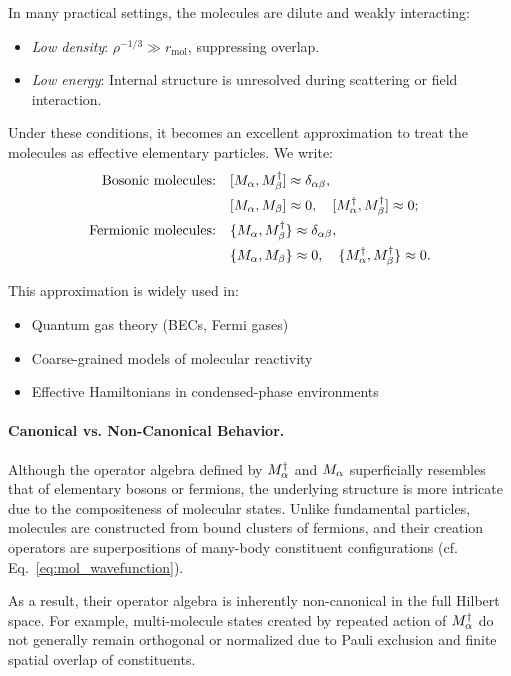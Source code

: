 In many practical settings, the molecules are dilute and weakly interacting:
\begin{itemize}
	\item \emph{Low density}: \(\rho^{-1/3} \gg r_\text{mol}\), suppressing overlap.
	\item \emph{Low energy}: Internal structure is unresolved during scattering or field interaction.
\end{itemize}

Under these conditions, it becomes an excellent approximation to treat the molecules as effective elementary particles. We write:
\begin{align}
	\text{Bosonic molecules:} \quad
	&[M_{\alpha}, M^\dagger_{\beta}] \approx \delta_{\alpha\beta}, \\
	&[M_{\alpha}, M_{\beta}] \approx 0, \quad [M^\dagger_{\alpha}, M^\dagger_{\beta}] \approx 0; \\
	\text{Fermionic molecules:} \quad
	&\{M_{\alpha}, M^\dagger_{\beta}\} \approx \delta_{\alpha\beta}, \\
	&\{M_{\alpha}, M_{\beta}\} \approx 0, \quad \{M^\dagger_{\alpha}, M^\dagger_{\beta}\} \approx 0.
\end{align}

This approximation is widely used in:
\begin{itemize}
	\item Quantum gas theory (BECs, Fermi gases)
	\item Coarse-grained models of molecular reactivity
	\item Effective Hamiltonians in condensed-phase environments
\end{itemize}

\paragraph{Canonical vs. Non-Canonical Behavior.}
Although the operator algebra defined by \(M^\dagger_{\alpha}\) and \(M_{\alpha}\) superficially resembles that of elementary bosons or fermions, the underlying structure is more intricate due to the compositeness of molecular states. Unlike fundamental particles, molecules are constructed from bound clusters of fermions, and their creation operators are superpositions of many-body constituent configurations (cf. Eq.~\eqref{eq:mol_wavefunction}).

As a result, their operator algebra is inherently non-canonical in the full Hilbert space. For example, multi-molecule states created by repeated action of \(M^\dagger_{\alpha}\) do not generally remain orthogonal or normalized due to Pauli exclusion and finite spatial overlap of constituents.


